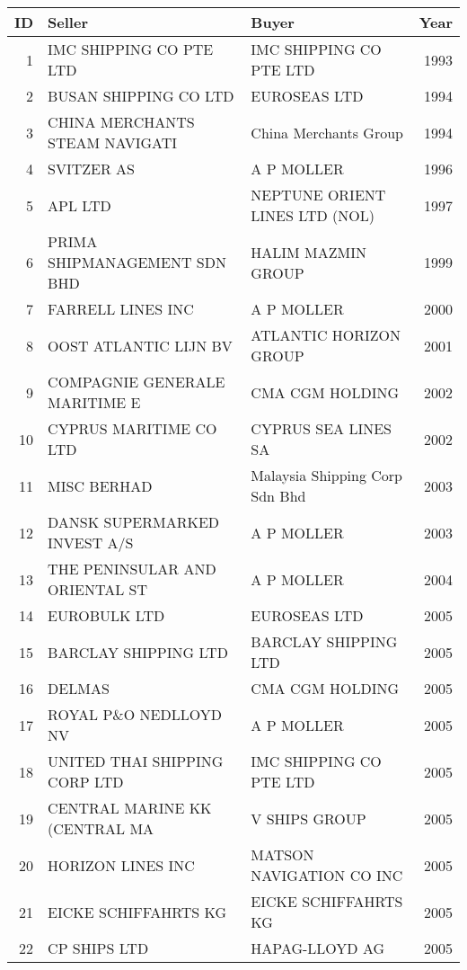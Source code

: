 
\begin{tabular}[t]{rllr}
\toprule
ID & Seller & Buyer & Year\\
\midrule
1 & IMC SHIPPING CO PTE LTD & IMC SHIPPING CO PTE LTD & 1993\\
2 & BUSAN SHIPPING CO LTD & EUROSEAS LTD & 1994\\
3 & CHINA MERCHANTS STEAM NAVIGATI & China Merchants Group & 1994\\
4 & SVITZER AS & A P MOLLER & 1996\\
5 & APL LTD & NEPTUNE ORIENT LINES LTD (NOL) & 1997\\
6 & PRIMA SHIPMANAGEMENT SDN BHD & HALIM MAZMIN GROUP & 1999\\
7 & FARRELL LINES INC & A P MOLLER & 2000\\
8 & OOST ATLANTIC LIJN BV & ATLANTIC HORIZON GROUP & 2001\\
9 & COMPAGNIE GENERALE MARITIME E & CMA CGM HOLDING & 2002\\
10 & CYPRUS MARITIME CO LTD & CYPRUS SEA LINES SA & 2002\\
11 & MISC BERHAD & Malaysia Shipping Corp Sdn Bhd & 2003\\
12 & DANSK SUPERMARKED INVEST A/S & A P MOLLER & 2003\\
13 & THE PENINSULAR AND ORIENTAL ST & A P MOLLER & 2004\\
14 & EUROBULK LTD & EUROSEAS LTD & 2005\\
15 & BARCLAY SHIPPING LTD & BARCLAY SHIPPING LTD & 2005\\
16 & DELMAS & CMA CGM HOLDING & 2005\\
17 & ROYAL P\&O NEDLLOYD NV & A P MOLLER & 2005\\
18 & UNITED THAI SHIPPING CORP LTD & IMC SHIPPING CO PTE LTD & 2005\\
19 & CENTRAL MARINE KK (CENTRAL MA & V SHIPS GROUP & 2005\\
20 & HORIZON LINES INC & MATSON NAVIGATION CO INC & 2005\\
21 & EICKE SCHIFFAHRTS KG & EICKE SCHIFFAHRTS KG & 2005\\
22 & CP SHIPS LTD & HAPAG-LLOYD AG & 2005\\
\bottomrule
\end{tabular}
